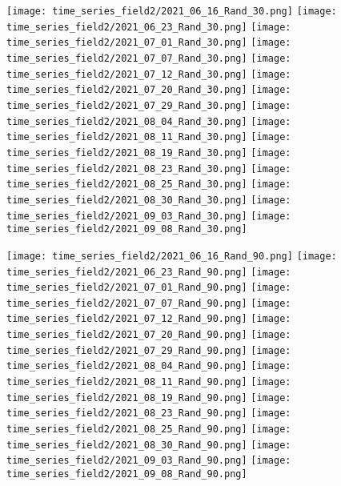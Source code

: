 \documentclass{article}
\begin{document}
\begin{figure}[t]
	
    \texttt{[image: time\_series\_field2/2021\_06\_16\_Rand\_30.png]}
    \texttt{[image: time\_series\_field2/2021\_06\_23\_Rand\_30.png]}
    \texttt{[image: time\_series\_field2/2021\_07\_01\_Rand\_30.png]}
    \texttt{[image: time\_series\_field2/2021\_07\_07\_Rand\_30.png]}
    \texttt{[image: time\_series\_field2/2021\_07\_12\_Rand\_30.png]}
    \texttt{[image: time\_series\_field2/2021\_07\_20\_Rand\_30.png]}
    \texttt{[image: time\_series\_field2/2021\_07\_29\_Rand\_30.png]}
    \texttt{[image: time\_series\_field2/2021\_08\_04\_Rand\_30.png]}
     \texttt{[image: time\_series\_field2/2021\_08\_11\_Rand\_30.png]}
     \texttt{[image: time\_series\_field2/2021\_08\_19\_Rand\_30.png]}
    \texttt{[image: time\_series\_field2/2021\_08\_23\_Rand\_30.png]}
    \texttt{[image: time\_series\_field2/2021\_08\_25\_Rand\_30.png]}
     \texttt{[image: time\_series\_field2/2021\_08\_30\_Rand\_30.png]}
     \texttt{[image: time\_series\_field2/2021\_09\_03\_Rand\_30.png]}
     \texttt{[image: time\_series\_field2/2021\_09\_08\_Rand\_30.png]}

    \texttt{[image: time\_series\_field2/2021\_06\_16\_Rand\_90.png]}
    \texttt{[image: time\_series\_field2/2021\_06\_23\_Rand\_90.png]}
    \texttt{[image: time\_series\_field2/2021\_07\_01\_Rand\_90.png]}
    \texttt{[image: time\_series\_field2/2021\_07\_07\_Rand\_90.png]}
    \texttt{[image: time\_series\_field2/2021\_07\_12\_Rand\_90.png]}
    \texttt{[image: time\_series\_field2/2021\_07\_20\_Rand\_90.png]}
    \texttt{[image: time\_series\_field2/2021\_07\_29\_Rand\_90.png]}
    \texttt{[image: time\_series\_field2/2021\_08\_04\_Rand\_90.png]}
     \texttt{[image: time\_series\_field2/2021\_08\_11\_Rand\_90.png]}
     \texttt{[image: time\_series\_field2/2021\_08\_19\_Rand\_90.png]}
    \texttt{[image: time\_series\_field2/2021\_08\_23\_Rand\_90.png]}
    \texttt{[image: time\_series\_field2/2021\_08\_25\_Rand\_90.png]}
     \texttt{[image: time\_series\_field2/2021\_08\_30\_Rand\_90.png]}
     \texttt{[image: time\_series\_field2/2021\_09\_03\_Rand\_90.png]}
     \texttt{[image: time\_series\_field2/2021\_09\_08\_Rand\_90.png]}


\end{figure}
\end{document}
